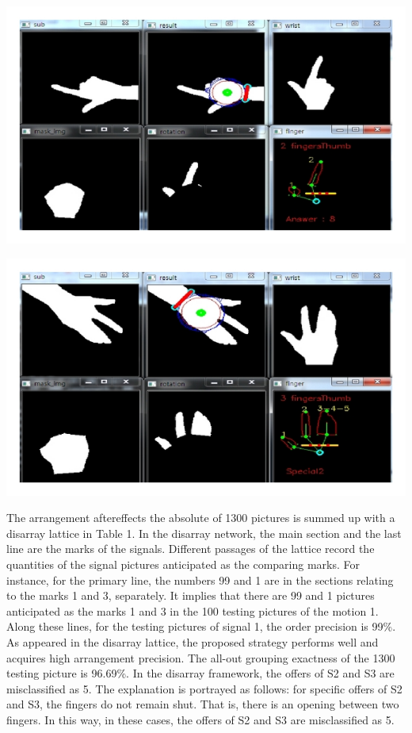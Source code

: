 \documentclass[a4paper]{article}
\begin{document}
\begin{center}
\vspace{1cm}

\includegraphics[scale=1.3]{Fig16}

\vspace{1cm}

\includegraphics[scale=1.3]{Fig17}
\end{center}


The arrangement aftereffects the absolute of 1300 pictures is summed up with a disarray lattice in Table 1. In the disarray network, the main section and the last line are the marks of the signals. Different passages of the lattice record the quantities of the signal pictures anticipated as the comparing marks. For instance, for the primary line, the numbers 99 and 1 are in the sections relating to the marks 1 and 3, separately. It implies that there are 99 and 1 pictures anticipated as the marks 1 and 3 in the 100 testing pictures of the motion 1. Along these lines, for the testing pictures of signal 1, the order precision is 99\%. As appeared in the disarray lattice, the proposed strategy performs well and acquires high arrangement precision. The all-out grouping exactness of the 1300 testing picture is 96.69\%. In the disarray framework, the offers of S2 and S3 are misclassified as 5. The explanation is portrayed as follows: for specific offers of S2 and S3, the fingers do not remain shut. That is, there is an opening between two fingers. In this way, in these cases, the offers of S2 and S3 are misclassified as 5.
\end{document}
